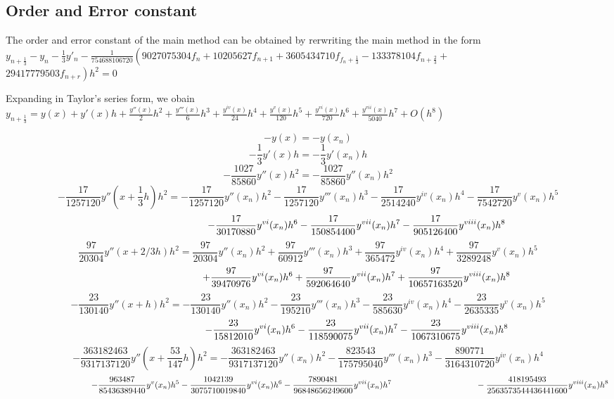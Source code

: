 \documentclass[12pt]{report}
\begin{document}
\subsection{Order and Error constant}
\noindent The order and error constant of the main method can be obtained by rerwriting the main method in the form
\\
$y_{n+\frac{1}{3}}-y_n -\frac{1}{3}y'_n-\frac{1}{754688106720}\left(9027075304 f_n +10205627 f_{n+1}+3605434710f_{f_n+\frac{1}{3}}-133378104f_{n+\frac{2}{3}}+\right.$\\ $\left.29417779503f_{n+r}\right)h^2=0$

\noindent Expanding in Taylor's series form, we obain\\
$y_{n+\frac{1}{3}}=y \left( x \right) + y'(x) h+{\frac {  y''\left( x \right) }{2}}{h}^{2}+{\frac {y'''\left( x \right)}{6}}{h}^{3}+{\frac {y^{iv}( x) }{24}}{h}^{4}+{\frac {y^v(x) }{120}}{h}^{5}+{\frac {y^{vi}  \left( x \right) }{720}
}{h}^{6}+{\frac{y^{vii}(x)}{5040}}{h}^{7}+O \left( {h}^{8} \right)$


$$-y(x) = -y(x_{n}) $$
$$-\frac{1}{3}y'(x)h = -\frac{1}{3}y'(x_{n})h$$ 
$$-{\frac {1027}{85860}}y''(x){h}^{2} = -{\frac {1027}{85860}}y''(x_{{n}}){h}^{2}$$	$$-{\frac {17}{1257120}}y''\left(x+\frac{1}{3}h\right){h}^{2} = -{\frac {17}{1257120}}y''(x_{n}){h}^{2}-{\frac {17}{1257120}}y'''(x_{n}){h}^{3}-{\frac {17}{2514240}}y^{iv}(x_{n}){h}^{4}-{\frac {17}{7542720}}y^{v}(x_{n}){h}^{5}$$
$$\hspace{35mm}-{\frac {17}{30170880}}y^{vi}(x_{n}){h}^{6}-{\frac {17}{150854400}}y^{vii}(x_{n}){h}^{7}-{\frac {17}{905126400}}y^{viii}(x_{n}){h}^{8}$$
$${\frac {97}{20304}}y''(x+2/3h){h}^{2} =  {\frac {97}{20304}}y''(x_{n}){h}^{2}+{\frac {97}{60912}}y'''(x_{n}){h}^{3}+{\frac {97}{365472}}y^{iv}(x_{n}){h}^{4}+{\frac {97}{3289248}}y^{v}(x_{n}){h}^{5}$$
$$\hspace{35mm}+{\frac {97}{39470976}}y^{vi}(x_{n}){h}^{6}+{\frac {97}{592064640}}y^{vii}(x_{n}){h}^{7}+{\frac {97}{10657163520}}y^{viii}(x_{n}){h}^{8}$$
$$-{\frac {23}{130140}}y''(x+h){h}^{2} = -{\frac {23}{130140}}y''(x_{n}){h}^{2}-{\frac {23}{195210}}y'''(x_{n}){h}^{3}-{\frac {23}{585630}}y^{iv}(x_{n}){h}^{4}-{\frac {23}{2635335}}y^{v}(x_{n}){h}^{5}$$
$$\hspace{35mm}-{\frac {23}{15812010}}y^{vi}(x_{n}){h}^{6}-{\frac {23}{118590075}}y^{vii}(x_{n}){h}^{7}-{\frac{23}{1067310675}}y^{viii}(x_{n}){h}^{8}$$
$$-{\frac {363182463}{9317137120}}y''(x+{\frac{53}{147}}h){h}^{2} = -{\frac {363182463}{9317137120}}y''(x_{n}){h}^{2}-{\frac {823543}{175795040}}y'''(x_{n}){h}^{3}-{\frac {890771}{3164310720}}y^{iv}(x_{n}){h}^{4}$$
$$\hspace{35mm}-{\frac {963487}{85436389440}}y^{v}(x_{n}){h}^{5}-{\frac {1042139}{3075710019840}}y^{vi}(x_{n}){h}^{6}-{\frac {7890481}{96848656249600}}y^{vii}(x_{n}){h}^{7}\hspace{35mm}-{\frac {418195493}{2563573544436441600}}y^{viii}(x_{n}){h}^{8}$$
\end{document}
